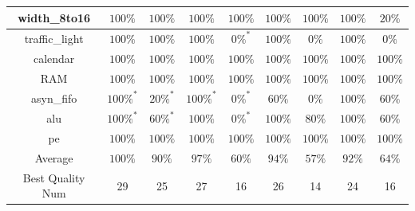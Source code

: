 \begin{tabular}{c|cc|cc|cc|cc}
width\_8to16 & \color{black} {\cellcolor{lightblue}} $100\%$ & \color{black} {\cellcolor{lightgreen}} $100\%$ & \color{black} {\cellcolor{lightblue}} $100\%$ & \color{black} {\cellcolor{lightgreen}} $100\%$ & \color{black} {\cellcolor{lightblue}} $100\%$ & \color{black} {\cellcolor{lightgreen}} $100\%$ & \color{black} {\cellcolor{lightblue}} $100\%$ & $20\%$ \\ \midrule
traffic\_light & \color{black} {\cellcolor{lightblue}} $100\%$ & \color{black} {\cellcolor{lightgreen}} $100\%$ & \color{black} {\cellcolor{lightblue}} $100\%$ & $0\%^*$ & \color{black} {\cellcolor{lightblue}} $100\%$ & $0\%$ & \color{black} {\cellcolor{lightblue}} $100\%$ & $0\%$ \\ \midrule
calendar & \color{black} {\cellcolor{lightblue}} $100\%$ & \color{black} {\cellcolor{lightgreen}} $100\%$ & \color{black} {\cellcolor{lightblue}} $100\%$ & \color{black} {\cellcolor{lightgreen}} $100\%$ & \color{black} {\cellcolor{lightblue}} $100\%$ & \color{black} {\cellcolor{lightgreen}} $100\%$ & \color{black} {\cellcolor{lightblue}} $100\%$ & \color{black} {\cellcolor{lightgreen}} $100\%$ \\ \midrule
RAM & \color{black} {\cellcolor{lightblue}} $100\%$ & \color{black} {\cellcolor{lightgreen}} $100\%$ & \color{black} {\cellcolor{lightblue}} $100\%$ & \color{black} {\cellcolor{lightgreen}} $100\%$ & \color{black} {\cellcolor{lightblue}} $100\%$ & \color{black} {\cellcolor{lightgreen}} $100\%$ & \color{black} {\cellcolor{lightblue}} $100\%$ & \color{black} {\cellcolor{lightgreen}} $100\%$ \\ \midrule
asyn\_fifo & \color{black} {\cellcolor{lightblue}} $100\%^*$ & $20\%^*$ & \color{black} {\cellcolor{lightblue}} $100\%^*$ & $0\%^*$ & $60\%$ & $0\%$ & \color{black} {\cellcolor{lightblue}} $100\%$ & \color{black} {\cellcolor{lightgreen}} $60\%$ \\ \midrule
alu & \color{black} {\cellcolor{lightblue}} $100\%^*$ & $60\%^*$ & \color{black} {\cellcolor{lightblue}} $100\%$ & $0\%^*$ & \color{black} {\cellcolor{lightblue}} $100\%$ & \color{black} {\cellcolor{lightgreen}} $80\%$ & \color{black} {\cellcolor{lightblue}} $100\%$ & $60\%$ \\ \midrule
pe & \color{black} {\cellcolor{lightblue}} $100\%$ & \color{black} {\cellcolor{lightgreen}} $100\%$ & \color{black} {\cellcolor{lightblue}} $100\%$ & \color{black} {\cellcolor{lightgreen}} $100\%$ & \color{black} {\cellcolor{lightblue}} $100\%$ & \color{black} {\cellcolor{lightgreen}} $100\%$ & \color{black} {\cellcolor{lightblue}} $100\%$ & \color{black} {\cellcolor{lightgreen}} $100\%$ \\ \midrule
Average & \color{black} {\cellcolor{lightblue}} $100\%$ & \color{black} {\cellcolor{lightgreen}} $90\%$ & $97\%$ & $60\%$ & $94\%$ & $57\%$ & $92\%$ & $64\%$ \\ \midrule
Best Quality Num & \color{black} {\cellcolor{lightblue}} 29 & \color{black} {\cellcolor{lightgreen}} 25 & 27 & 16 & 26 & 14 & 24 & 16 \\
\bottomrule
\end{tabular}
